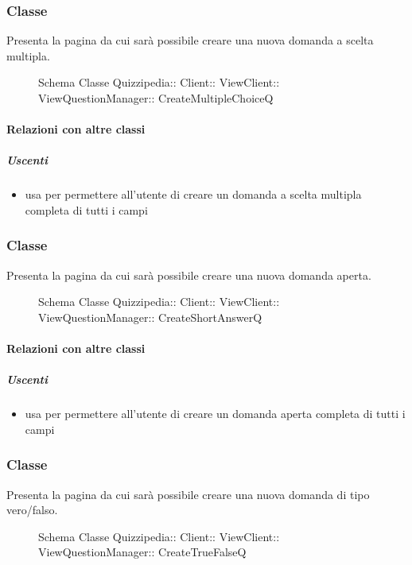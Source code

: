 \subsubsection{Classe }
Presenta la pagina da cui sarà possibile creare una nuova domanda a scelta multipla.
\begin{figure}[H]
\centering
\noindent{}
\caption[Schema Classe CreateMultipleChoiceQ]{Schema Classe Quizzipedia:: Client:: ViewClient:: ViewQuestionManager:: CreateMultipleChoiceQ}
\end{figure}
\paragraph{Relazioni con altre classi}
\subparagraph{Uscenti}
\begin{itemize}
\item usa  per permettere all'utente di creare un domanda a scelta multipla completa di tutti i campi
\end{itemize}
\subsubsection{Classe }
Presenta la pagina da cui sarà possibile creare una nuova domanda aperta.
\begin{figure}[H]
\centering
\noindent{}
\caption[Schema Classe CreateShortAnswerQ]{Schema Classe Quizzipedia:: Client:: ViewClient:: ViewQuestionManager:: CreateShortAnswerQ}
\end{figure}
\paragraph{Relazioni con altre classi}
\subparagraph{Uscenti}
\begin{itemize}
\item usa  per permettere all'utente di creare un domanda aperta completa di tutti i campi
\end{itemize}
\subsubsection{Classe }
Presenta la pagina da cui sarà possibile creare una nuova domanda di tipo vero/falso.
\begin{figure}[H]
\centering
\noindent{}
\caption[Schema Classe CreateTrueFalseQ]{Schema Classe Quizzipedia:: Client:: ViewClient:: ViewQuestionManager:: CreateTrueFalseQ}
\end{figure}
